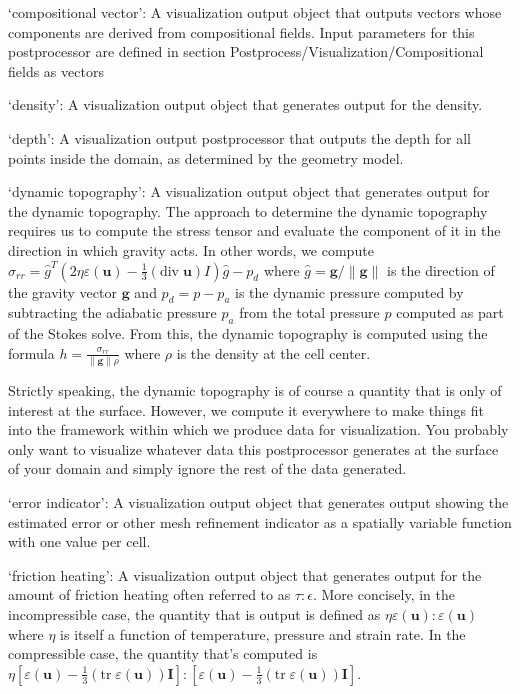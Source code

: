 \begin{itemize}
`compositional vector': A visualization output object that outputs vectors whose components are derived from compositional fields. Input parameters for this postprocessor are defined in section Postprocess/Visualization/Compositional fields as vectors

`density': A visualization output object that generates output for the density.

`depth': A visualization output postprocessor that outputs the depth for all points inside the domain, as determined by the geometry model.

`dynamic topography': A visualization output object that generates output for the dynamic topography. The approach to determine the dynamic topography requires us to compute the stress tensor and evaluate the component of it in the direction in which gravity acts. In other words, we compute $\sigma_{rr}={\hat g}^T(2 \eta \varepsilon(\mathbf u)-\frac 13 (\textrm{div}\;\mathbf u)I)\hat g - p_d$ where $\hat g = \mathbf g/\|\mathbf g\|$ is the direction of the gravity vector $\mathbf g$ and $p_d=p-p_a$ is the dynamic pressure computed by subtracting the adiabatic pressure $p_a$ from the total pressure $p$ computed as part of the Stokes solve. From this, the dynamic topography is computed using the formula $h=\frac{\sigma_{rr}}{\|\mathbf g\| \rho}$ where $\rho$ is the density at the cell center.

Strictly speaking, the dynamic topography is of course a quantity that is only of interest at the surface. However, we compute it everywhere to make things fit into the framework within which we produce data for visualization. You probably only want to visualize whatever data this postprocessor generates at the surface of your domain and simply ignore the rest of the data generated.

`error indicator': A visualization output object that generates output showing the estimated error or other mesh refinement indicator as a spatially variable function with one value per cell.

`friction heating': A visualization output object that generates output for the amount of friction heating often referred to as $\tau:\epsilon$. More concisely, in the incompressible case, the quantity that is output is defined as $\eta \varepsilon(\mathbf u):\varepsilon(\mathbf u)$ where $\eta$ is itself a function of temperature, pressure and strain rate. In the compressible case, the quantity that's computed is $\eta [\varepsilon(\mathbf u)-\tfrac 13(\textrm{tr}\;\varepsilon(\mathbf u))\mathbf I]:[\varepsilon(\mathbf u)-\tfrac 13(\textrm{tr}\;\varepsilon(\mathbf u))\mathbf I]$.


\end{itemize}
